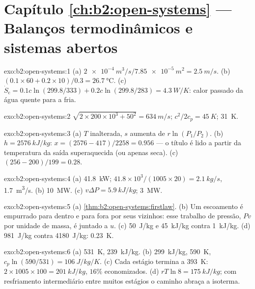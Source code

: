 \section*{Capítulo \ref{ch:b2:open-systems} --- Balanços termodinâmicos e sistemas abertos}

\begin{solution}{exo:b2:open-systems:1}
(a) $\qty{2e-4}{m^3/s}/\qty{7.85e-5}{m^2} = \qty{2.5}{m/s}$. (b) $(0.1 \times 60 + 0.2
\times 10)/0.3 = \qty{26.7}{\celsius}$. (c) $\dot S_{\text{c}} = 0.1c\ln(299.8/333) +
0.2c\ln(299.8/283) = \qty{4.3}{W/K}$: calor passado da água quente para a fria.
\end{solution}

\begin{solution}{exo:b2:open-systems:2}
$\sqrt{2 \times 200 \times 10^3 + 50^2} = \qty{634}{m/s}$; $c^2/2c_p = \qty{45}{K}$;
\qty{31}{K}.
\end{solution}

\begin{solution}{exo:b2:open-systems:3}
(a) $T$ inalterada, $s$ aumenta de $r\ln(P_1/P_2)$. (b) $h = \qty{2576}{kJ/kg}$:
$x = (2576 - 417)/2258 = 0.956$ --- o título é lido a partir da
temperatura da saída superaquecida (ou apenas seca). (c) $(256 -
200)/199 = 0.28$.
\end{solution}

\begin{solution}{exo:b2:open-systems:4}
(a) \qty{41.8}{kW}; $41.8 \times 10^3/(1005 \times 20) = \qty{2.1}{kg/s}$, \qty{1.7}{m^3/s}.
(b) \qty{10}{MW}. (c) $v\Delta P = \qty{5.9}{kJ/kg}$; \qty{3}{MW}.
\end{solution}

\begin{solution}{exo:b2:open-systems:5}
(a) \cref{thm:b2:open-systems:firstlaw}. (b) Um escoamento é empurrado para dentro e
para fora por seus vizinhos: esse trabalho de pressão, $Pv$ por unidade de massa, é
juntado a $u$. (c) \qty{50}{J/kg} e \qty{45}{kJ/kg} contra \qty{1}{kJ/kg}.
(d) \qty{981}{J/kg} contra \qty{4180}{J/kg}: \qty{0.23}{K}.
\end{solution}

\begin{solution}{exo:b2:open-systems:6}
(a) \qty{531}{K}, \qty{239}{kJ/kg}. (b) \qty{299}{kJ/kg}, \qty{590}{K}, $c_p\ln(590/531)
= \qty{106}{J/kg/K}$. (c) Cada estágio termina a \qty{393}{K}: $2 \times 1005 \times 100 =
\qty{201}{kJ/kg}$, $16\%$ economizados. (d) $rT\ln 8 = \qty{175}{kJ/kg}$; com
resfriamento intermediário entre muitos estágios o caminho abraça a isoterma.
\end{solution}

